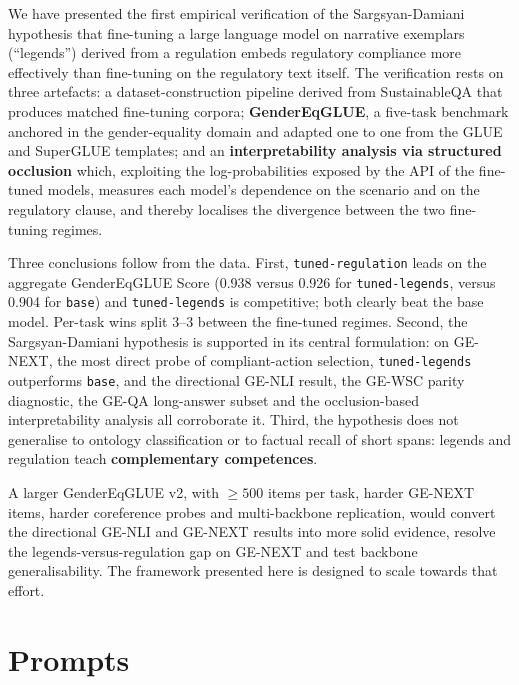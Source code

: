 \documentclass[pdflatex, sn-apa]{sn-jnl}%
\theoremstyle{thmstyleone}%
\theoremstyle{thmstyletwo}%
\theoremstyle{thmstylethree}%
\newcommand{\modelbase}{\texttt{base}}
\newcommand{\modellegends}{\texttt{tuned-legends}}
\newcommand{\modelreg}{\texttt{tuned-regulation}}
\begin{document}
We have presented the first empirical verification of the Sargsyan-Damiani
hypothesis that fine-tuning a large language model on narrative exemplars
(``legends'') derived from a regulation embeds regulatory compliance more
effectively than fine-tuning on the regulatory text itself. The verification
rests on three artefacts: a dataset-construction pipeline derived from
SustainableQA that produces matched fine-tuning corpora; \textbf{GenderEqGLUE}, a
five-task benchmark anchored in the gender-equality domain and adapted one to one
from the GLUE and SuperGLUE templates; and an \textbf{interpretability analysis
via structured occlusion} which, exploiting the log-probabilities exposed by the
API of the fine-tuned models, measures each model's dependence on the scenario and
on the regulatory clause, and thereby localises the divergence between the two
fine-tuning regimes.

Three conclusions follow from the data. First, \modelreg{} leads on the aggregate
GenderEqGLUE Score (0.938 versus 0.926 for \modellegends, versus 0.904 for
\modelbase) and \modellegends{} is competitive; both clearly beat the base model.
Per-task wins split 3--3 between the fine-tuned regimes. Second, the
Sargsyan-Damiani hypothesis is supported in its central formulation: on GE-NEXT,
the most direct probe of compliant-action selection, \modellegends{} outperforms
\modelbase{}, and the directional GE-NLI result, the GE-WSC parity diagnostic, the
GE-QA long-answer subset and the occlusion-based interpretability analysis all
corroborate it. Third, the hypothesis does not generalise to ontology
classification or to factual recall of short spans: legends and regulation teach
\textbf{complementary competences}.

A larger GenderEqGLUE v2, with $\geq 500$ items per task, harder GE-NEXT items,
harder coreference probes and multi-backbone replication, would convert the
directional GE-NLI and GE-NEXT results into more solid evidence, resolve the
legends-versus-regulation gap on GE-NEXT and test backbone generalisability. The
framework presented here is designed to scale towards that effort.


\appendix
{}
\section{Prompts}
\end{document}
